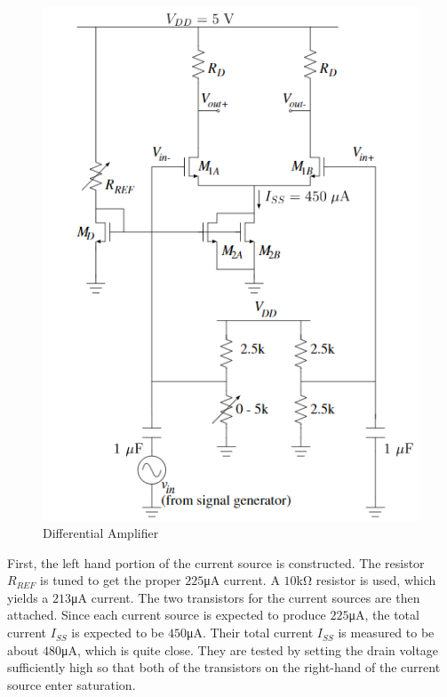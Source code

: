 \FloatBarrier

\begin{figure}[h!]
	\centering
	\includegraphics[scale=0.75]{./images/circuit.PNG}
	\caption{Differential Amplifier}
	\label{fig:circuit}
\end{figure}

\FloatBarrier

First, the left hand portion of the current source is constructed.
The resistor $R_{REF}$ is tuned to get the proper $225$\si{\micro\ampere} current.
A $10$\si{\kilo\ohm} resistor is used, which yields a $213$\si{\micro\ampere} current.
The two transistors for the current sources are then attached.
Since each current source is expected to produce $225$\si{\micro\ampere}, the total current $I_{SS}$ is expected to be $450$\si{\micro\ampere}.
Their total current $I_{SS}$ is measured to be about $480$\si{\micro\ampere}, which is quite close.
They are tested by setting the drain voltage sufficiently high so that both of the transistors on the right-hand of the current source enter saturation. \\

